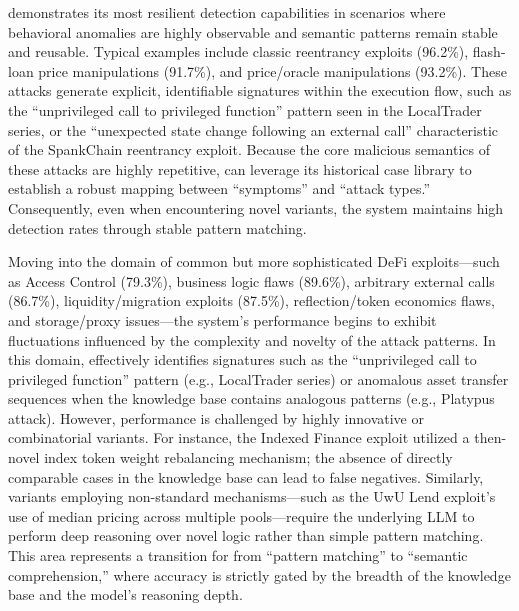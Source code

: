 \approach{} demonstrates its most resilient detection capabilities in scenarios where behavioral anomalies are highly observable and semantic patterns remain stable and reusable. Typical examples include classic reentrancy exploits (96.2\%), flash-loan price manipulations (91.7\%), and price/oracle manipulations (93.2\%). These attacks generate explicit, identifiable signatures within the execution flow, such as the ``unprivileged call to privileged function'' pattern seen in the LocalTrader series, or the ``unexpected state change following an external call'' characteristic of the SpankChain reentrancy exploit. Because the core malicious semantics of these attacks are highly repetitive, \approach{} can leverage its historical case library to establish a robust mapping between ``symptoms'' and ``attack types.'' Consequently, even when encountering novel variants, the system maintains high detection rates through stable pattern matching.

Moving into the domain of common but more sophisticated DeFi exploits---such as Access Control (79.3\%), business logic flaws (89.6\%), arbitrary external calls (86.7\%), liquidity/migration exploits (87.5\%), reflection/token economics flaws, and storage/proxy issues---the system’s performance begins to exhibit fluctuations influenced by the complexity and novelty of the attack patterns. In this domain, \approach{} effectively identifies signatures such as the ``unprivileged call to privileged function'' pattern (e.g., LocalTrader series) or anomalous asset transfer sequences when the knowledge base contains analogous patterns (e.g., Platypus attack). However, performance is challenged by highly innovative or combinatorial variants. For instance, the Indexed Finance exploit utilized a then-novel index token weight rebalancing mechanism; the absence of directly comparable cases in the knowledge base can lead to false negatives. Similarly, variants employing non-standard mechanisms---such as the UwU Lend exploit’s use of median pricing across multiple pools---require the underlying LLM to perform deep reasoning over novel logic rather than simple pattern matching. This area represents a transition for \approach{} from ``pattern matching'' to ``semantic comprehension,'' where accuracy is strictly gated by the breadth of the knowledge base and the model’s reasoning depth.

